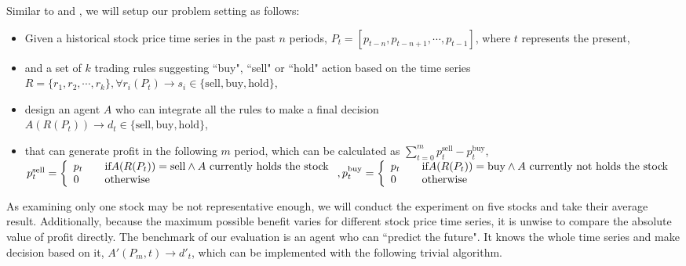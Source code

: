 \documentclass{article}
\begin{document}
Similar to \cite{genetic-algorithms-for-predicting-the-egyptian-stock-market}
and \cite{stock-timing-using-genetic-algorithms},
we will setup our problem setting as follows:
\begin{itemize}
	\item Given a historical stock price time series in the past $n$ periods, $P_t=\left[p_{t-n}, p_{t-n+1}, \cdots, p_{t-1}\right]$,
	      where $t$ represents the present,
	\item and a set of $k$ trading rules suggesting ``buy", ``sell" or ``hold" action based on the time series\\
	      $R=\{r_1, r_2, \cdots, r_k\}, \forall r_i(P_t) \rightarrow s_i \in \{\text{sell}, \text{buy}, \text{hold}\}$,
	\item design an agent $A$ who can integrate all the rules to make a final decision\\
	      $A(R(P_t)) \rightarrow d_t \in \{\text{sell}, \text{buy}, \text{hold}\}$,
	\item that can generate profit in the following $m$ period,
	      which can be calculated as $\sum \limits_{t=0}^{m} p_{t}^{\text{sell}} - p_{t}^{\text{buy}}$,\\
	      $p_{t}^{\text{sell}} = \left\{
		      \begin{array}{ll}
			      p_t \quad & \text{if} A(R(P_t)) = \text{sell} \wedge A \text{ currently holds the stock} \\
			      0 \quad   & \text{otherwise}
		      \end{array}\right.,\\
		      p_t^{\text{buy}} = \left\{
		      \begin{array}{ll}
			      p_t \quad & \text{if} A(R(P_t)) = \text{buy} \wedge A \text{ currently not holds the stock} \\
			      0 \quad   & \text{otherwise}
		      \end{array}
		      \right.$
\end{itemize}

As examining only one stock may be not representative enough,
we will conduct the experiment on five stocks and take their average result.
Additionally, because the maximum possible benefit varies for different stock price time series,
it is unwise to compare the absolute value of profit directly.
The benchmark of our evaluation is an agent who can ``predict the future".
It knows the whole time series and make decision based on it,
$A'(P_m, t) \rightarrow d'_t$,
which can be implemented with the following trivial algorithm.
\end{document}
